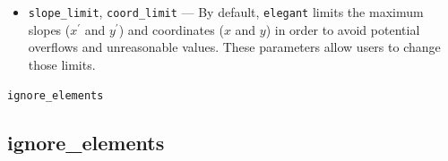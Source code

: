 \documentclass[11pt]{article}
\begin{document}
\begin{itemize}
\begin{itemize}
    offsets and roll (\verb|TILT|). 
  \item 1 --- Indicates the new method \cite{Venturini2021} in entrance-centered
    mode in the linear approximation. This includes the possibility of pitch and yaw errors on elements that support it. 
  \item 2 --- Indicates the new method in body-centered mode in the linear approximation. 
    This includes the possibility of pitch and yaw errors on elements that support it. 
  \item 3 --- Indicates the new method \cite{Venturini2021} in entrance-centered
    mode using an exact form.  This includes the possibility of pitch and yaw errors on elements that support it. 
  \item 4 --- Indicates the new method in body-centered mode using an exact form.
    This includes the possibility of pitch and yaw errors on elements that support it. 
  \end{itemize}
\item \verb|slope_limit|, \verb|coord_limit| --- By default, \verb|elegant| limits the maximum slopes ($x^\prime$ and
  $y^\prime$) and coordinates ($x$ and $y$) in order to avoid potential overflows and unreasonable values. These
  parameters allow users to change those limits.
\end{itemize}


\newpage
\begin{center}{\Large\verb|ignore_elements|}\end{center}
\subsection{ignore\_elements \label{subsec:ignoreelements}}
\end{document}
